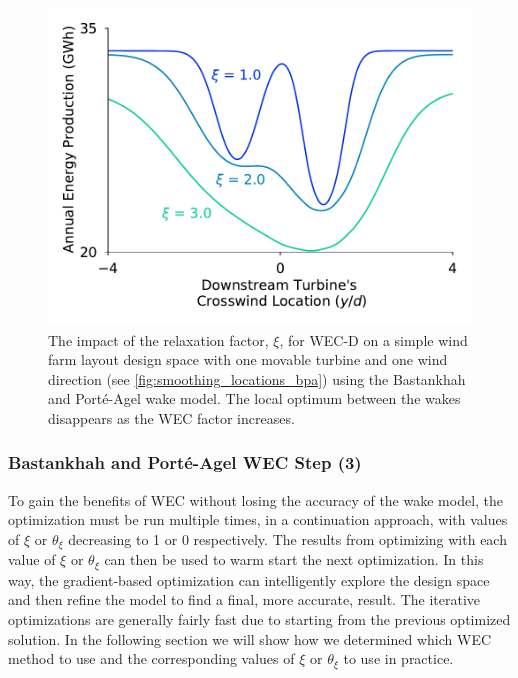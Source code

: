 \documentclass[a4paper]{jpconf}
\begin{document}
\begin{figure}[ht]
	\begin{minipage}[t]{0.47\textwidth}
		\centering
		\includegraphics[width=\textwidth]{smoothing_bpa_wec_d}
		\caption{The impact of the relaxation factor, $\xi$, for WEC-D on a simple wind farm layout design space with one movable turbine and one wind direction (see \cref{fig:smoothing_locations_bpa}) using the Bastankhah and Port\'{e}-Agel wake model. The local optimum between the wakes disappears as the WEC factor increases.}
		\label{fig:smoothing_bpa_wec_d}
	\end{minipage} %
\end{figure}

\subsubsection{Bastankhah and Port\'e-Agel WEC Step (3)}
To gain the benefits of WEC without losing the accuracy of the wake model, the optimization must be run multiple times, in a continuation approach, with values of $\xi$ or $\theta_\xi$ decreasing to 1 or 0 respectively. The results from optimizing with each value of $\xi$ or $\theta_\xi$ can then be used to warm start the next optimization. In this way, the gradient-based optimization can intelligently explore the design space and then refine the model to find a final, more accurate, result. The iterative optimizations are generally fairly fast due to starting from the previous optimized solution. In the following section we will show how we determined which WEC method to use and the corresponding values of $\xi$ or $\theta_\xi$ to use in practice.
\end{document}
